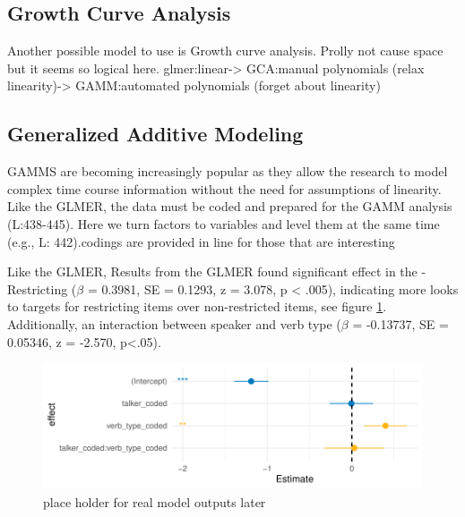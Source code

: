 \subsection{Growth Curve Analysis}

Another possible model to use is Growth curve analysis. Prolly not cause space but it seems so logical here. glmer:linear-> GCA:manual polynomials (relax linearity)-> GAMM:automated polynomials (forget about linearity)


\subsection{Generalized Additive Modeling}

GAMMS are becoming increasingly popular as they allow the research to model complex time course information without the need for assumptions of linearity. Like the GLMER, the data must be coded and prepared for the GAMM analysis (L:438-445). Here we turn factors to variables and level them at the same time (e.g., L: 442).codings are provided in line for those that are interesting



Like the GLMER, Results from the GLMER found significant effect in the -Restricting ($\beta$ = 0.3981, SE = 0.1293, z = 3.078, p < .005), indicating more looks to targets for restricting items over non-restricted items, see figure \ref{fig:model_gamm_effects}. Additionally, an interaction between speaker and verb type ($\beta$ = -0.13737, SE = 0.05346, z = -2.570, p<.05). 

\begin{figure}[h]
    \centering
    \includegraphics[width=\textwidth]{figures/model_gamm_effects.pdf}
    \caption{place holder for real model outputs later}
    \label{fig:model_gamm_effects}
\end{figure}